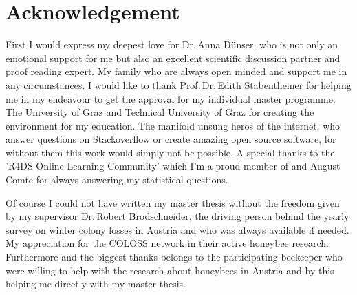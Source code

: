 \chapter*{Acknowledgement}
\label{sec:acknowledgement}
\vspace*{-10mm}

First I would express my deepest love for Dr.\,Anna Dünser, who is not only an emotional support for me but also an excellent scientific discussion partner and proof reading expert. My family who are always open minded and support me in any circumstances. I would like to thank Prof.\,Dr.\,Edith Stabentheiner for helping me in my endeavour to get the approval for my individual master programme. The University of Graz and Technical University of Graz for creating the environment for my education. The manifold unsung heros of the internet, who answer questions on Stackoverflow or create amazing open source software, for without them this work would simply not be possible. A special thanks to the 'R4DS Online Learning Community' which I'm a proud member of and August Comte for always answering my statistical questions.

Of course I could not have written my master thesis without the freedom given by my supervisor Dr.\,Robert Brodschneider, the driving person behind the yearly survey on winter colony losses in Austria and who was always available if needed. My appreciation for the COLOSS network in their active honeybee research. Furthermore and the biggest thanks belongs to the participating beekeeper who were willing to help with the research about honeybees in Austria and by this helping me directly with my master thesis.